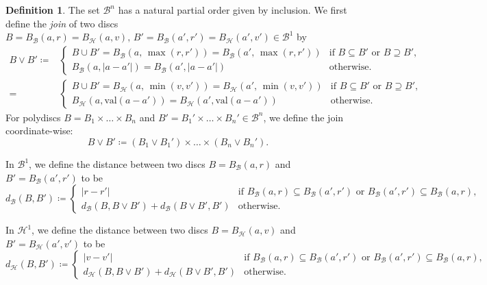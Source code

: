 \documentclass[10pt]{article}
\theoremstyle{definition}
\newtheorem{definition}[theorem]{Definition}
\newcommand{\val}{{\mathrm{val}}}
\begin{document}
\begin{definition}\label{def:joinAndMetric}
  The set $\mathcal B^n$ has a natural partial order given by inclusion.  We first define the \emph{join} of two discs $B=B_{\mathcal{B}}(a,r)=B_{\mathcal{H}}(a,v),\, B'=B_{\mathcal{B}}(a',r')=B_{\mathcal{H}}(a',v')\in \mathcal B^1$ by
  \begin{align*}
    B\vee B'\coloneqq&
    \begin{cases}
        B\cup B' = B_{\mathcal{B}}(a,\, \max(r,r')) = B_{\mathcal{B}}(a',\, \max(r,r')) &\text{if } B\subseteq B' \text{ or } B\supseteq B',\\
        B_{\mathcal{B}}(a,|a-a'|) = B_{\mathcal{B}}(a',|a-a'|) &\text{otherwise}.
    \end{cases}\\[2mm]
    =&
    \begin{cases}
        B\cup B' = B_{\mathcal{H}}(a,\, \min(v,v')) = B_{\mathcal{H}}(a',\, \min(v,v')) &\text{if } B\subseteq B' \text{ or } B\supseteq B',\\
        B_{\mathcal{H}}(a,\val(a-a')) = B_{\mathcal{H}}(a',\val(a-a')) &\text{otherwise}.
    \end{cases}
  \end{align*}
  For polydiscs $B=B_1\times\dots\times B_n$ and $B'=B_1'\times\dots\times B_n'\in\mathcal B^n$, we define the join coordinate-wise:
  \begin{equation*}
    B\vee B'\coloneqq (B_1\vee B_1')\times\dots\times (B_n\vee B_n').
  \end{equation*}
  
  In $\mathcal B^1$, we define the distance between two discs $B=B_{\mathcal{B}}(a,r)$ and $B'=B_{\mathcal{B}}(a',r')$ to be
  \begin{equation*}
    d_{\mathcal{B}}(B, B') \coloneqq
    \begin{cases}
      |r-r'| &\text{if } B_{\mathcal{B}}(a,r) \subseteq B_{\mathcal{B}}(a',r') \text{ or } B_{\mathcal{B}}(a',r') \subseteq B_{\mathcal{B}}(a,r),\\[2mm]
      d_{\mathcal{B}}(B, B \vee B')+ d_{\mathcal{B}}(B \vee B', B') &\text{otherwise}.
    \end{cases}
  \end{equation*}
  
  In $\mathcal H^1$, we define the distance between two discs $B=B_{\mathcal{H}}(a,v)$ and $B'=B_{\mathcal{H}}(a',v')$ to be
  \begin{equation*}
    d_{\mathcal{H}}(B, B') \coloneqq
    \begin{cases}
      |v-v'| &\text{if } B_{\mathcal{B}}(a,r) \subseteq B_{\mathcal{B}}(a',r') \text{ or } B_{\mathcal{B}}(a',r') \subseteq B_{\mathcal{B}}(a,r),\\[2mm]
      d_{\mathcal{H}}(B, B \vee B')+ d_{\mathcal{H}}(B \vee B', B') &\text{otherwise}.
    \end{cases}
  \end{equation*}


\end{definition}
\end{document}

